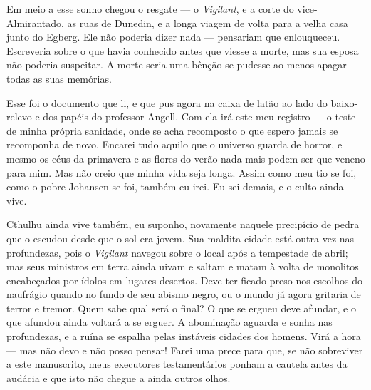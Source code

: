\begin{pages}
\begin{Rightside}
Em meio a esse sonho chegou o resgate
--- o \emph{Vigilant}, e a corte
do vice-Almirantado, as ruas de Dunedin, e a longa viagem de volta para
a velha casa junto do Egberg. Ele não poderia dizer nada --- pensariam
que enlouqueceu. Escreveria sobre o que havia conhecido antes que viesse
a morte, mas sua esposa não poderia suspeitar. A morte seria uma bênção
se pudesse ao menos apagar todas as suas memórias.

Esse foi o documento que li, e que pus agora na caixa de latão ao lado
do baixo-relevo e dos papéis do professor Angell. Com ela irá este meu
registro --- o teste de minha própria sanidade, onde se acha recomposto
o que espero jamais se recomponha de novo. Encarei tudo aquilo que o
universo guarda de horror, e mesmo os céus da primavera e as flores do
verão nada mais podem ser que veneno para mim. Mas não creio que minha
vida seja longa. Assim como meu tio se foi, como o pobre Johansen se
foi, também eu irei. Eu sei demais, e o culto ainda vive.

Cthulhu ainda vive também, eu suponho, novamente naquele precipício de
pedra que o escudou desde que o sol era jovem. Sua maldita cidade está
outra vez nas profundezas, pois o \emph{Vigilant} navegou sobre o local
após a tempestade de abril; mas seus ministros em terra ainda uivam e
saltam e matam à volta de monolitos encabeçados por ídolos em lugares
desertos. Deve ter ficado preso nos escolhos do naufrágio quando no
fundo de seu abismo negro, ou o mundo já agora gritaria de terror e
tremor. Quem sabe qual será o final? O que se ergueu deve afundar, e o
que afundou ainda voltará a se erguer. A abominação aguarda e sonha nas
profundezas, e a ruína se espalha pelas instáveis cidades dos homens.
Virá a hora --- mas não devo e não posso pensar! Farei uma prece para
que, se não sobreviver a este manuscrito, meus executores testamentários
ponham a cautela antes da audácia e que isto não chegue a ainda outros
olhos.

\pend
         \endnumbering
    \end{Rightside}
\end{pages}
\Pages